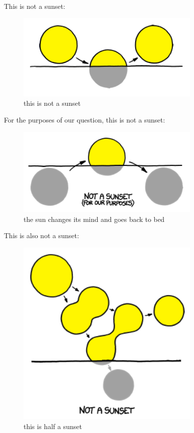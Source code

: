 {This is not a sunset:}

\begin{figure}[!htbp]
\centering
\includegraphics[scale=0.5, max width=0.8\textwidth]{imgs/a/42/sunset_touch.png}
\caption{this is not a sunset}
\end{figure}

{For the purposes of our question, this is not a sunset:}

\begin{figure}[!htbp]
\centering
\includegraphics[scale=0.5, max width=0.8\textwidth]{imgs/a/42/sunset_halfrise.png}
\caption{the sun changes its mind and goes back to bed}
\end{figure}

{This is also not a sunset:}

\begin{figure}[!htbp]
\centering
\includegraphics[scale=0.5, max width=0.8\textwidth]{imgs/a/42/sunset_not_mitosis.png}
\caption{this is half a sunset}
\end{figure}


